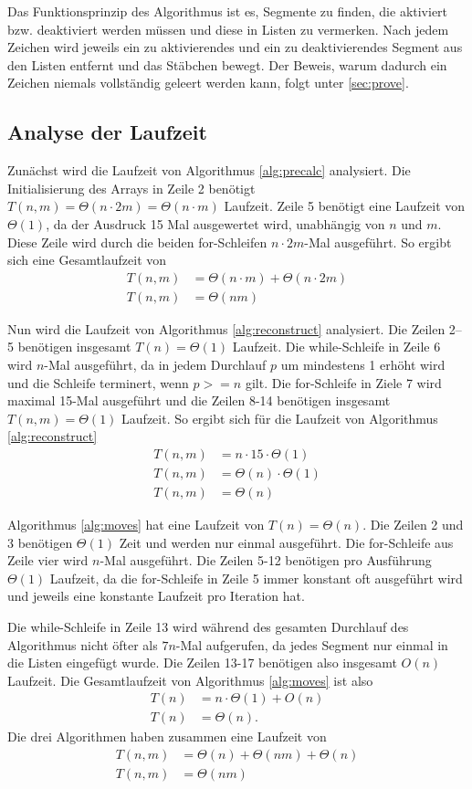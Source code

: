 \documentclass[a4paper,10pt,ngerman]{scrartcl}
\begin{document}
Das Funktionsprinzip des Algorithmus ist es, Segmente zu finden, die aktiviert bzw. deaktiviert werden müssen und diese in Listen zu vermerken. Nach jedem Zeichen wird jeweils ein zu aktivierendes und ein zu deaktivierendes Segment aus den Listen entfernt und das Stäbchen bewegt. Der Beweis, warum dadurch ein Zeichen niemals vollständig geleert werden kann, folgt unter \ref{sec:prove}.
\subsection{Analyse der Laufzeit}
Zunächst wird die Laufzeit von Algorithmus \ref{alg:precalc} analysiert.
Die Initialisierung des Arrays in Zeile 2 benötigt $T(n, m) = \Theta(n \cdot 2 m) = \Theta(n \cdot m)$ Laufzeit.
Zeile 5 benötigt eine Laufzeit von $\Theta(1)$, da der Ausdruck 15 Mal ausgewertet wird, unabhängig von $n$ und $m$.
Diese Zeile wird durch die beiden for-Schleifen $n \cdot 2m$-Mal ausgeführt. 
So ergibt sich eine Gesamtlaufzeit von 
\begin{align*}
    T(n, m) &= \Theta(n \cdot m) + \Theta(n \cdot 2m)\\
    T(n, m) &= \Theta(nm)
\end{align*}

Nun wird die Laufzeit von Algorithmus \ref{alg:reconstruct} analysiert.
Die Zeilen 2–5 benötigen insgesamt $T(n) = \Theta(1)$ Laufzeit. 
Die while-Schleife in Zeile 6 wird $n$-Mal ausgeführt, da in jedem Durchlauf $p$ um mindestens 1 erhöht wird und die Schleife terminert, wenn $p >= n$ gilt. 
Die for-Schleife in Ziele 7 wird maximal 15-Mal ausgeführt und die Zeilen 8-14 benötigen insgesamt $T(n,m) = \Theta(1)$ Laufzeit. 
So ergibt sich für die Laufzeit von Algorithmus \ref{alg:reconstruct}
\begin{align*}
    T(n,m) &= n \cdot 15 \cdot \Theta(1)\\
    T(n, m) &= \Theta(n) \cdot \Theta(1)\\
    T(n, m) &= \Theta(n)
\end{align*}

Algorithmus \ref{alg:moves} hat eine Laufzeit von $T(n) = \Theta(n)$. Die Zeilen 2 und 3 benötigen $\Theta(1)$ Zeit und werden nur einmal ausgeführt. 
Die for-Schleife aus Zeile vier wird $n$-Mal ausgeführt. 
Die Zeilen 5-12 benötigen pro Ausführung $\Theta(1)$ Laufzeit, da die for-Schleife in Zeile 5 immer konstant oft ausgeführt wird und jeweils eine konstante Laufzeit pro Iteration hat. 

Die while-Schleife in Zeile 13 wird während des gesamten Durchlauf des Algorithmus nicht öfter als $7n$-Mal aufgerufen, da jedes Segment nur einmal in die Listen eingefügt wurde. Die Zeilen 13-17 benötigen also insgesamt $O(n)$ Laufzeit.
Die Gesamtlaufzeit von Algorithmus \ref{alg:moves} ist also 
\begin{align*}
    T(n) &= n \cdot \Theta(1) + O(n)\\
    T(n) &= \Theta(n).
\end{align*}
Die drei Algorithmen haben zusammen eine Laufzeit von 
\begin{align*}
    T(n, m) &= \Theta(n) + \Theta(nm) + \Theta(n)\\
    T(n, m) &= \Theta(nm)
\end{align*}
\end{document}
